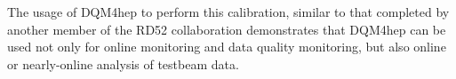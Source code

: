 The usage of DQM4hep to perform this calibration, similar to that completed by another member of the RD52 collaboration \cite{idea-equalisation} demonstrates that DQM4hep can be used not only for online monitoring and data quality monitoring, but also online or nearly-online analysis of testbeam data.

%
%
%
%
%

